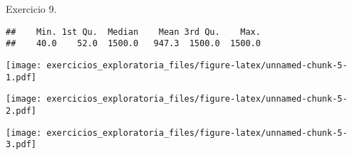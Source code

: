 \documentclass[
]{article}
\newenvironment{Shaded}{\begin{snugshade}}{\end{snugshade}}
\newcommand{\AttributeTok}[1]{\textcolor[rgb]{0.13,0.29,0.53}{#1}}
\newcommand{\DecValTok}[1]{\textcolor[rgb]{0.00,0.00,0.81}{#1}}
\newcommand{\FunctionTok}[1]{\textcolor[rgb]{0.13,0.29,0.53}{\textbf{#1}}}
\newcommand{\NormalTok}[1]{#1}
\newcommand{\OtherTok}[1]{\textcolor[rgb]{0.56,0.35,0.01}{#1}}
\newcommand{\SpecialCharTok}[1]{\textcolor[rgb]{0.81,0.36,0.00}{\textbf{#1}}}
\newcommand{\StringTok}[1]{\textcolor[rgb]{0.31,0.60,0.02}{#1}}
\begin{document}
Exercicio 9.

\begin{Shaded}
\end{Shaded}

\begin{verbatim}
##    Min. 1st Qu.  Median    Mean 3rd Qu.    Max. 
##    40.0    52.0  1500.0   947.3  1500.0  1500.0
\end{verbatim}

\begin{Shaded}
\end{Shaded}

\texttt{[image: exercicios\_exploratoria\_files/figure-latex/unnamed-chunk-5-1.pdf]}

\begin{Shaded}
\end{Shaded}

\texttt{[image: exercicios\_exploratoria\_files/figure-latex/unnamed-chunk-5-2.pdf]}

\begin{Shaded}
\end{Shaded}

\texttt{[image: exercicios\_exploratoria\_files/figure-latex/unnamed-chunk-5-3.pdf]}

\begin{Shaded}
\end{Shaded}
\end{document}
